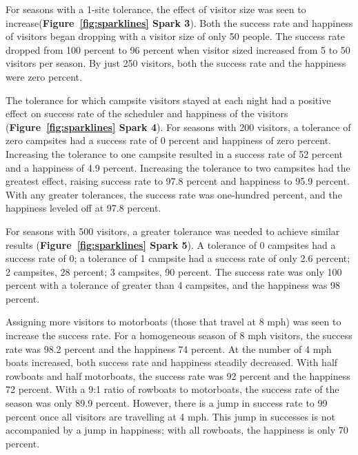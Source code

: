 \documentclass[11pt]{article} %
\begin{document}
For seasons with a  1-site tolerance, the effect of visitor size was seen to
increase(\textbf{Figure~\ref{fig:sparklines} Spark 3}). Both the
success rate and happiness of visitors began dropping with a visitor size of
only 50 people. The success rate dropped from 100 percent to 96 percent
when visitor sized increased from 5 to 50 visitors per season. By just 250
visitors, both the success rate and the happiness were zero percent.

The tolerance for which campsite visitors stayed at each night had a positive
effect on success rate of the scheduler and happiness of the visitors
(\textbf{Figure~\ref{fig:sparklines} Spark 4}).  For seasons with
200 visitors, a tolerance of zero campsites had a success rate of 0 percent
and happiness of zero percent. Increasing the tolerance to one campsite
resulted in a success rate of 52 percent and a happiness of 4.9 percent.
Increasing the tolerance to two campsites had the greatest effect, raising
success rate to 97.8 percent and happiness to 95.9 percent. With any greater
tolerances, the success rate was one-hundred percent, and the happiness
leveled off at 97.8 percent.

For seasons with 500 visitors, a greater tolerance was needed to achieve
similar results (\textbf{Figure~\ref{fig:sparklines} Spark 5}).
A tolerance of 0 campsites
had a success rate of 0; a tolerance of 1 campsite had a success rate of
only 2.6 percent; 2 campsites, 28 percent; 3 campsites, 90 percent. The
success rate was only 100 percent with a tolerance of greater than 4 campsites,
and the happiness was 98 percent.

Assigning more visitors to motorboats (those that travel at 8 mph) was seen
to increase the success rate. For a homogeneous season of 8 mph visitors, the
success rate was 98.2 percent and the happiness 74 percent. At the number
of 4 mph boats increased, both success rate and happiness steadily decreased.
With half rowboats and half motorboats, the success rate was 92 percent and
the happiness 72 percent. With a 9:1 ratio of rowboats to motorboats, the
success rate of the season was only 89.9 percent. However, there is a jump
in success rate to 99 percent once all visitors are travelling at 4 mph. This
jump in successes is not accompanied by a jump in happiness; with all
rowboats, the happiness is only 70 percent.
\end{document}

